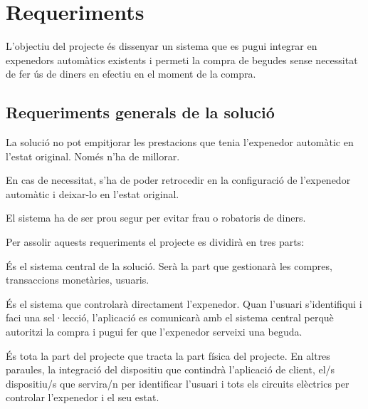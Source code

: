 \chapter{Requeriments}\label{chapter:requeriments}

L'objectiu del projecte és dissenyar un sistema que es pugui integrar en expenedors automàtics existents i permeti la compra de begudes sense necessitat de fer ús de diners en efectiu en el moment de la compra.

\section{Requeriments generals de la solució}
\begin{description}[font=\normalfont\textbf]\itemsep2pt 
\vspace{-1em}
\parskip1pt 
\item[Millors prestacions] La solució no pot empitjorar les prestacions que tenia l'expenedor automàtic en l'estat original. Només n'ha de millorar.
\item[Reversibilitat] En cas de necessitat, s'ha de poder retrocedir en la configuració de l'expenedor automàtic i deixar-lo en l'estat original.
\item[Seguretat] El sistema ha de ser prou segur per evitar frau o robatoris de diners.
\end{description}

Per assolir aquests requeriments el projecte es dividirà en tres parts:
\begin{description}[font=\normalfont\textbf]\itemsep2pt 
\vspace{-1em}
\parskip1pt 
\item [Aplicació de Servidor] És el sistema central de la solució. Serà la part que gestionarà les compres, transaccions monetàries, usuaris.
\item [Aplicació de Client] És el sistema que controlarà directament l'expenedor. Quan l'usuari s'identifiqui i faci una sel·lecció, l'aplicació es comunicarà amb el sistema central perquè autoritzi la compra i pugui fer que l'expenedor serveixi una beguda.
\item [Implementació i integració del hardware] És tota la part del projecte que tracta la part física del projecte. En altres paraules, la integració del dispositiu que contindrà l'aplicació de client, el/s dispositiu/s que servira/n per identificar l'usuari i tots els circuits elèctrics per controlar l'expenedor i el seu estat. 
\vspace{-1em}
\end{description}

